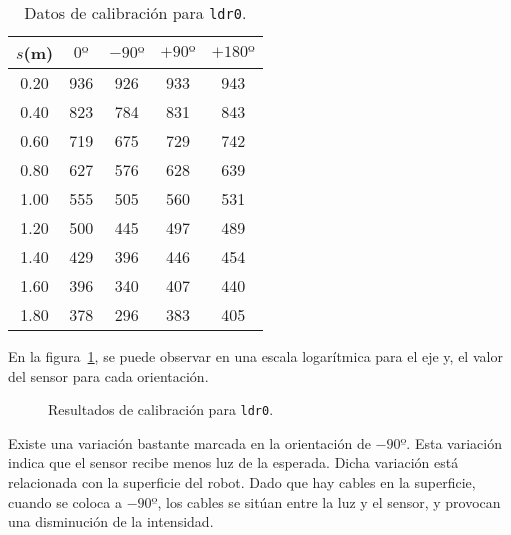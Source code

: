 \documentclass[10pt,a4paper,hidelinks,twocolumn]{article}
\begin{document}
\begin{table}[h]
\centering
\begin{tabular}{ | c | c | c | c | c | }
\hline
$s$(m) & $0º$ & $-90º$ & $+90º$ & $+180º$ \\ \hline
0.20 & 936 & 926 & 933 & 943 \\ \hline
0.40 & 823 & 784 & 831 & 843 \\ \hline
0.60 & 719 & 675 & 729 & 742 \\ \hline
0.80 & 627 & 576 & 628 & 639 \\ \hline
1.00 & 555 & 505 & 560 & 531 \\ \hline
1.20 & 500 & 445 & 497 & 489 \\ \hline
1.40 & 429 & 396 & 446 & 454 \\ \hline
1.60 & 396 & 340 & 407 & 440 \\ \hline
1.80 & 378 & 296 & 383 & 405 \\ \hline
\end{tabular}
\caption{Datos de calibración para \texttt{ldr0}.\label{tab:ldr0}}
\end{table}

En la figura~\ref{fig:ldr0}, se puede observar en una escala logarítmica para el 
eje y, el valor del sensor para cada orientación.

\begin{figure}[h]
\centering
{}
\caption{Resultados de calibración para \texttt{ldr0}.\label{fig:ldr0}}
\end{figure}

Existe una variación bastante marcada en la orientación de $-90º$. Esta 
variación indica que el sensor recibe menos luz de la esperada. Dicha variación 
está relacionada con la superficie del robot. Dado que hay cables en la 
superficie, cuando se coloca a $-90º$, los cables se sitúan entre la luz y el 
sensor, y provocan una disminución de la intensidad.
\end{document}
